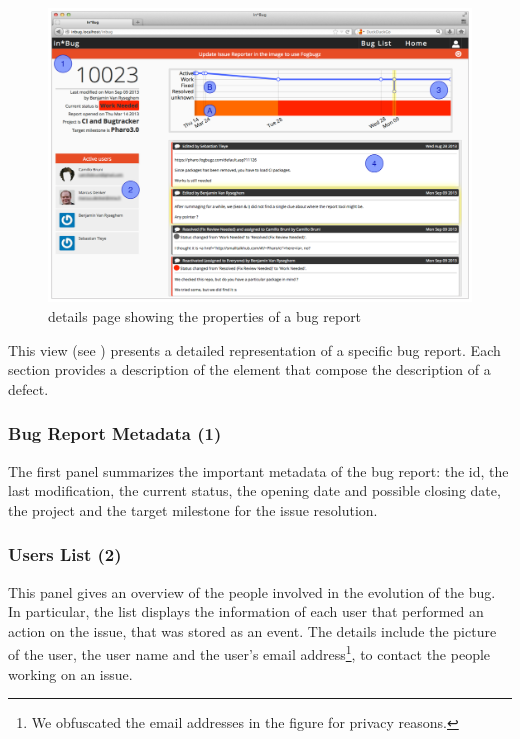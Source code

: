 \begin{figure}[ht]
\begin{center}
\includegraphics[width=\linewidth]{Images/visualize/details-page.pdf}
\caption{\ib details page showing the properties of a bug report}
\label{fig-inbug-home}
\end{center}
\end{figure}

This view (see ) presents a detailed representation of a specific bug report.
Each section provides a description of the element that compose the description of a defect.


\subsubsection{Bug Report Metadata (1)}
The first panel summarizes the important metadata of the bug report: the id, the last modification, the current status, the opening date and possible closing date, the project and the target milestone for the issue resolution.

\subsubsection{Users List (2)}
This panel gives an overview of the people involved in the evolution of the bug.
In particular, the list displays the information of each user that performed an action on the issue, that was stored as an event.
The details include the picture of the user, the user name and the user's email address\footnote{We obfuscated the email addresses in the figure for privacy reasons.}, to contact the people working on an issue.

